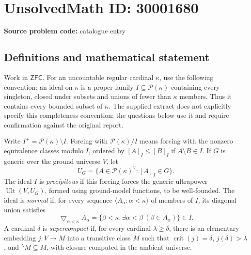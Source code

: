 \documentclass[11pt]{article}
\begin{document}
\section*{UnsolvedMath ID: 30001680}
\textbf{Source problem code:} catalogue entry
\subsection{Definitions and mathematical statement}
Work in \(\mathsf{ZFC}\). For an uncountable regular cardinal \(\kappa\), use the following convention: an ideal on \(\kappa\) is a proper family \(I\subseteq\mathcal P(\kappa)\) containing every singleton, closed under subsets and unions of fewer than \(\kappa\) members. Thus it contains every bounded subset of \(\kappa\). The supplied extract does not explicitly specify this completeness convention; the questions below use it and require confirmation against the original report.

Write \(I^+=\mathcal P(\kappa)\setminus I\). Forcing with \(\mathcal P(\kappa)/I\) means forcing with the nonzero equivalence classes modulo \(I\), ordered by \([A]_I\leq[B]_I\) if \(A\setminus B\in I\). If \(G\) is generic over the ground universe \(V\), let
\[
U_G=\{A\in\mathcal P(\kappa)^V:[A]_I\in G\}.
\]
The ideal \(I\) is \emph{precipitous} if this forcing forces the generic ultrapower \(\operatorname{Ult}(V,U_G)\), formed using ground-model functions, to be well-founded. The ideal is \emph{normal} if, for every sequence \(\langle A_\alpha:\alpha<\kappa\rangle\) of members of \(I\), its diagonal union satisfies
\[
\mathop{\bigtriangledown}_{\alpha<\kappa}A_\alpha
=\{\beta<\kappa:\exists\alpha<\beta\ (\beta\in A_\alpha)\}\in I.
\]
A cardinal \(\delta\) is \emph{supercompact} if, for every cardinal \(\lambda\geq\delta\), there is an elementary embedding \(j:V\to M\) into a transitive class \(M\) such that \(\operatorname{crit}(j)=\delta\), \(j(\delta)>\lambda\), and \({}^{\lambda}M\subseteq M\), with closure computed in the ambient universe.
\end{document}
